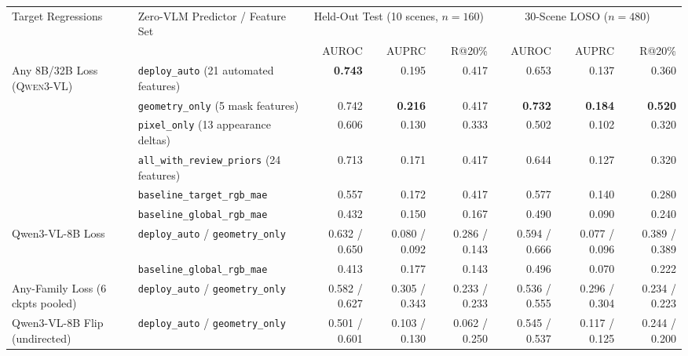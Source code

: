 \begin{tabular}{@{}llrrrrrr@{}}
\toprule
Target Regressions & Zero-VLM Predictor / Feature Set & \multicolumn{3}{c}{Held-Out Test (10 scenes, $n{=}160$)} & \multicolumn{3}{c}{30-Scene LOSO ($n{=}480$)} \\
\cmidrule(lr){3-5} \cmidrule(lr){6-8}
 & & AUROC & AUPRC & R@20\% & AUROC & AUPRC & R@20\% \\
\midrule
\multirow{6}{*}{Any 8B/32B Loss (\textsc{Qwen3-VL})} & \texttt{deploy\_auto} (21 automated features) & \textbf{0.743} & 0.195 & 0.417 & 0.653 & 0.137 & 0.360 \\
 & \texttt{geometry\_only} (5 mask features) & 0.742 & \textbf{0.216} & 0.417 & \textbf{0.732} & \textbf{0.184} & \textbf{0.520} \\
 & \texttt{pixel\_only} (13 appearance deltas) & 0.606 & 0.130 & 0.333 & 0.502 & 0.102 & 0.320 \\
 & \texttt{all\_with\_review\_priors} (24 features) & 0.713 & 0.171 & 0.417 & 0.644 & 0.127 & 0.320 \\
 & \texttt{baseline\_target\_rgb\_mae} & 0.557 & 0.172 & 0.417 & 0.577 & 0.140 & 0.280 \\
 & \texttt{baseline\_global\_rgb\_mae} & 0.432 & 0.150 & 0.167 & 0.490 & 0.090 & 0.240 \\
\midrule
\multirow{2}{*}{Qwen3-VL-8B Loss} & \texttt{deploy\_auto} / \texttt{geometry\_only} & 0.632 / 0.650 & 0.080 / 0.092 & 0.286 / 0.143 & 0.594 / 0.666 & 0.077 / 0.096 & 0.389 / 0.389 \\
 & \texttt{baseline\_global\_rgb\_mae} & 0.413 & 0.177 & 0.143 & 0.496 & 0.070 & 0.222 \\
\midrule
Any-Family Loss (6 ckpts pooled) & \texttt{deploy\_auto} / \texttt{geometry\_only} & 0.582 / 0.627 & 0.305 / 0.343 & 0.233 / 0.233 & 0.536 / 0.555 & 0.296 / 0.304 & 0.234 / 0.223 \\
Qwen3-VL-8B Flip (undirected) & \texttt{deploy\_auto} / \texttt{geometry\_only} & 0.501 / 0.601 & 0.103 / 0.130 & 0.062 / 0.250 & 0.545 / 0.537 & 0.117 / 0.125 & 0.244 / 0.200 \\
\bottomrule
\end{tabular}
